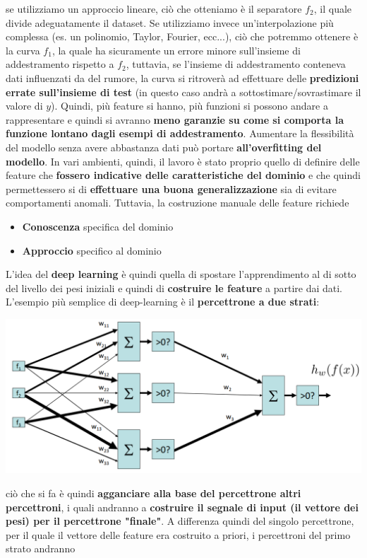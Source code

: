\documentclass[12pt]{article}
\begin{document}
se utilizziamo un approccio lineare, ciò che otteniamo è il separatore $f_2$, il quale divide adeguatamente il dataset.
Se utilizziamo invece un'interpolazione più complessa (es. un polinomio, Taylor, Fourier, ecc...), ciò che potremmo ottenere è la curva $f_1$, la quale ha sicuramente un errore minore sull'insieme di addestramento rispetto a $f_2$, tuttavia, se l'insieme di addestramento conteneva dati influenzati da del rumore,
la curva si ritroverà ad effettuare delle \textbf{predizioni errate sull'insieme di test} (in questo caso andrà a sottostimare/sovrastimare il valore di $y$).
Quindi, più feature si hanno, più funzioni si possono andare a rappresentare e quindi si avranno \textbf{meno garanzie su come si comporta la funzione lontano dagli esempi di addestramento}.
Aumentare la flessibilità del modello senza avere abbastanza dati può portare \textbf{all'overfitting del modello}.
In vari ambienti, quindi, il lavoro è stato proprio quello di definire delle feature che \textbf{fossero indicative delle caratteristiche del dominio} e che quindi permettessero si di \textbf{effettuare una buona generalizzazione} sia di evitare
comportamenti anomali. Tuttavia, la costruzione manuale delle feature richiede
\begin{itemize}
    \item \textbf{Conoscenza} specifica del dominio
    \item \textbf{Approccio} specifico al dominio
\end{itemize}
L'idea del \textbf{deep learning} è quindi quella di spostare l'apprendimento al di sotto del livello dei pesi iniziali e quindi di \textbf{costruire le feature} a partire dai dati.
L'esempio più semplice di deep-learning è il \textbf{percettrone a due strati}:
\begin{center}
    \includegraphics[width =1\linewidth]{Images/108.PNG}
\end{center}
ciò che si fa è quindi \textbf{agganciare alla base del percettrone altri percettroni}, i quali andranno a \textbf{costruire il segnale di input (il vettore dei pesi) per il percettrone "finale"}. A differenza quindi del singolo percettrone, per il quale il vettore delle feature era costruito a priori, i percettroni del primo strato andranno
\end{document}
